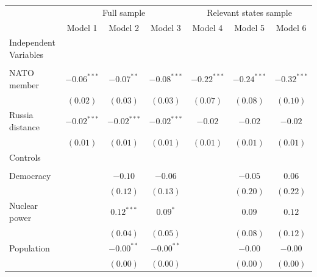 \documentclass[
]{article}
\begin{document}
\begin{table}[h!]
\begin{center}
\begin{tabular}{l c c c c c c}
\hline
 & \multicolumn{3}{c}{Full sample} & \multicolumn{3}{c}{Relevant states sample} \\
\cline{2-4} \cline{5-7}
 & Model 1 & Model 2 & Model 3 & Model 4 & Model 5 & Model 6 \\
\hline
Independent Variables &               &               &               &               &               &               \\
                      &               &               &               &               &               &               \\
\quad NATO member     & $-0.06^{***}$ & $-0.07^{**}$  & $-0.08^{***}$ & $-0.22^{***}$ & $-0.24^{***}$ & $-0.32^{***}$ \\
                      & $(0.02)$      & $(0.03)$      & $(0.03)$      & $(0.07)$      & $(0.08)$      & $(0.10)$      \\
\quad Russia distance & $-0.02^{***}$ & $-0.02^{***}$ & $-0.02^{***}$ & $-0.02$       & $-0.02$       & $-0.02$       \\
                      & $(0.01)$      & $(0.01)$      & $(0.01)$      & $(0.01)$      & $(0.01)$      & $(0.01)$      \\
Controls              &               &               &               &               &               &               \\
                      &               &               &               &               &               &               \\
\quad Democracy       &               & $-0.10$       & $-0.06$       &               & $-0.05$       & $0.06$        \\
                      &               & $(0.12)$      & $(0.13)$      &               & $(0.20)$      & $(0.22)$      \\
\quad Nuclear power   &               & $0.12^{***}$  & $0.09^{*}$    &               & $0.09$        & $0.12$        \\
                      &               & $(0.04)$      & $(0.05)$      &               & $(0.08)$      & $(0.12)$      \\
\quad Population      &               & $-0.00^{**}$  & $-0.00^{**}$  &               & $-0.00$       & $-0.00$       \\
                      &               & $(0.00)$      & $(0.00)$      &               & $(0.00)$      & $(0.00)$      \\

\end{tabular}
\end{center}
\end{table}
\end{document}
